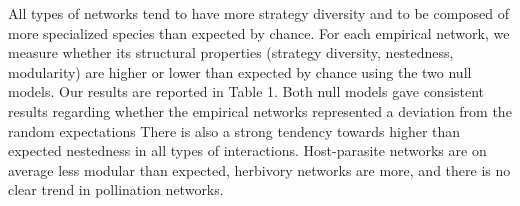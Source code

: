All types of networks tend to have more strategy diversity and to be composed
of more specialized species than expected by chance. For each empirical
network, we measure whether its structural properties (strategy diversity,
nestedness, modularity) are higher or lower than expected by chance using
the two null models. Our results are reported in Table 1. Both null models
gave consistent results regarding whether the empirical networks represented a
deviation from the random expectations There is also a strong tendency towards
higher than expected nestedness in all types of interactions. Host-parasite
networks are on average less modular than expected, herbivory networks are
more, and there is no clear trend in pollination networks.
